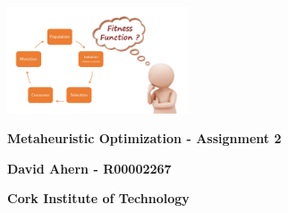 \begin{titlepage}
    \begin{center}
        \includegraphics[width=0.4\textwidth]{images/cover.jpeg}

        \vspace*{1cm}

        \textbf{Metaheuristic Optimization - Assignment 2}

        \vspace{0.5cm}


        \vspace{1.5cm}

        \textbf{David Ahern - R00002267}

        \vspace{0.5cm}
        \textbf{Cork Institute of Technology}

    \end{center}
\end{titlepage}
